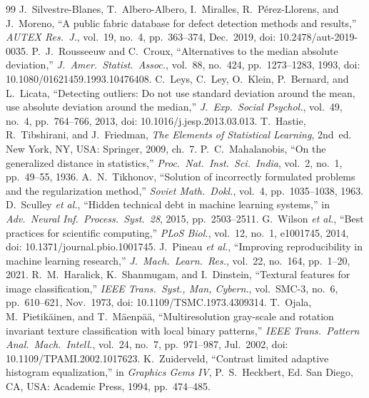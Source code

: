 \documentclass[11pt,a4paper]{article}
\begin{document}
\begin{thebibliography}{99}
\small
{} J.~Silvestre-Blanes, T.~Albero-Albero, I.~Miralles, R.~P\'erez-Llorens, and J.~Moreno, ``A public fabric database for defect detection methods and results,'' \emph{AUTEX Res.\ J.}, vol.~19, no.~4, pp.~363--374, Dec.\ 2019, doi: 10.2478/aut-2019-0035.
 P.~J.~Rousseeuw and C.~Croux, ``Alternatives to the median absolute deviation,'' \emph{J.\ Amer.\ Statist.\ Assoc.}, vol.~88, no.~424, pp.~1273--1283, 1993, doi: 10.1080/01621459.1993.10476408.
 C.~Leys, C.~Ley, O.~Klein, P.~Bernard, and L.~Licata, ``Detecting outliers: Do not use standard deviation around the mean, use absolute deviation around the median,'' \emph{J.\ Exp.\ Social Psychol.}, vol.~49, no.~4, pp.~764--766, 2013, doi: 10.1016/j.jesp.2013.03.013.
 T.~Hastie, R.~Tibshirani, and J.~Friedman, \emph{The Elements of Statistical Learning}, 2nd~ed. New York, NY, USA: Springer, 2009, ch.~7.
 P.~C.~Mahalanobis, ``On the generalized distance in statistics,'' \emph{Proc.\ Nat.\ Inst.\ Sci.\ India}, vol.~2, no.~1, pp.~49--55, 1936.
 A.~N.~Tikhonov, ``Solution of incorrectly formulated problems and the regularization method,'' \emph{Soviet Math.\ Dokl.}, vol.~4, pp.~1035--1038, 1963.
 D.~Sculley \emph{et al.}, ``Hidden technical debt in machine learning systems,'' in \emph{Adv.\ Neural Inf.\ Process.\ Syst.~28}, 2015, pp.~2503--2511.
 G.~Wilson \emph{et al.}, ``Best practices for scientific computing,'' \emph{PLoS Biol.}, vol.~12, no.~1, e1001745, 2014, doi: 10.1371/journal.pbio.1001745.
 J.~Pineau \emph{et al.}, ``Improving reproducibility in machine learning research,'' \emph{J.\ Mach.\ Learn.\ Res.}, vol.~22, no.~164, pp.~1--20, 2021.
 R.~M.~Haralick, K.~Shanmugam, and I.~Dinstein, ``Textural features for image classification,'' \emph{IEEE Trans.\ Syst., Man, Cybern.}, vol.~SMC-3, no.~6, pp.~610--621, Nov.\ 1973, doi: 10.1109/TSMC.1973.4309314.
 T.~Ojala, M.~Pietik\"ainen, and T.~M\"aenp\"a\"a, ``Multiresolution gray-scale and rotation invariant texture classification with local binary patterns,'' \emph{IEEE Trans.\ Pattern Anal.\ Mach.\ Intell.}, vol.~24, no.~7, pp.~971--987, Jul.\ 2002, doi: 10.1109/TPAMI.2002.1017623.
 K.~Zuiderveld, ``Contrast limited adaptive histogram equalization,'' in \emph{Graphics Gems IV}, P.~S.~Heckbert, Ed. San Diego, CA, USA: Academic Press, 1994, pp.~474--485.
\end{thebibliography}
\end{document}
